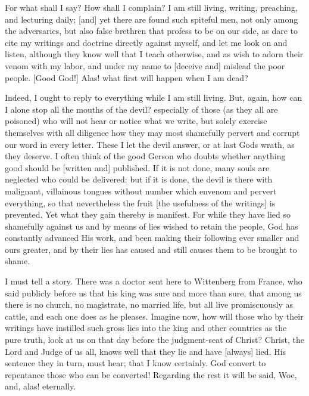 For what shall I say? How shall I complain? I am still living,
writing, preaching, and lecturing daily; [and] yet there are
found such spiteful men, not only among the adversaries, but
also false brethren that profess to be on our side, as dare to
cite my writings and doctrine directly against myself, and let
me look on and listen, although they know well that I teach
otherwise, and as wish to adorn their venom with my labor, and
under my name to [deceive and] mislead the poor people. [Good
God!] Alas! what first will happen when I am dead?

Indeed, I ought to reply to everything while I am still
living. But, again, how can I alone stop all the mouths of the
devil? especially of those (as they all are poisoned) who will
not hear or notice what we write, but solely exercise
themselves with all diligence how they may most shamefully
pervert and corrupt our word in every letter. These I let the
devil answer, or at last Gods wrath, as they deserve. I often
think of the good Gerson who doubts whether anything good
should be [written and] published. If it is not done, many
souls are neglected who could be delivered: but if it is done,
the devil is there with malignant, villainous tongues without
number which envenom and pervert everything, so that
nevertheless the fruit [the usefulness of the writings] is
prevented. Yet what they gain thereby is manifest. For while
they have lied so shamefully against us and by means of lies
wished to retain the people, God has constantly advanced His
work, and been making their following ever smaller and ours
greater, and by their lies has caused and still causes them to
be brought to shame.

I must tell a story. There was a doctor sent here to
Wittenberg from France, who said publicly before us that his
king was sure and more than sure, that among us there is no
church, no magistrate, no married life, but all live
promiscuously as cattle, and each one does as he pleases.
Imagine now, how will those who by their writings have
instilled such gross lies into the king and other countries as
the pure truth, look at us on that day before the
judgment-seat of Christ? Christ, the Lord and Judge of us all,
knows well that they lie and have [always] lied, His sentence
they in turn, must hear; that I know certainly. God convert to
repentance those who can be converted! Regarding the rest it
will be said, Woe, and, alas! eternally.

